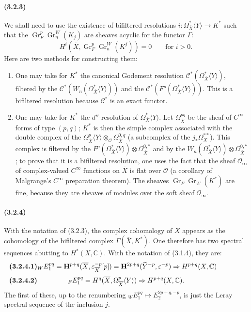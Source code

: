 \documentclass[10pt]{article}
\newcommand{\C}{\mathbb C}
\newcommand{\Gr}{\operatorname{Gr}}
\begin{document}
\paragraph{(3.2.3)} We shall need to use the existence of bifiltered resolutions $i:\Omega_{\overline X}^{*}\langle Y\rangle\longrightarrow K^*$ such that the $\Gr_F^p\Gr_n^W(K_j)$ are sheaves acyclic for the functor $\Gamma$:
\[
H^i(\overline X,\Gr_F^p\Gr_n^W(K^j))=0\qquad \text{for }i>0.
\]
Here are two methods for constructing them:
\begin{enumerate}[label=\textit{\alph*)}]
\item One may take for $K^*$ the canonical Godement resolution $\mathcal C^*(\Omega_{\overline X}^{*}\langle Y\rangle)$, filtered by the $\mathcal C^*(W_n(\Omega_{\overline X}^{*}\langle Y\rangle))$ and the $\mathcal C^*(F^p(\Omega_{\overline X}^{*}\langle Y\rangle))$. This is a bifiltered resolution because $\mathcal C^*$ is an exact functor.
\item One may take for $K^*$ the $d''$-resolution of $\Omega_{\overline X}^{*}\langle Y\rangle$. Let $\Omega_{\overline X}^{pq}$ be the sheaf of $C^\infty$ forms of type $(p,q)$; $K^*$ is then the simple complex associated with the double complex of the $\Omega_{\overline X}^{p}\langle Y\rangle\otimes_{\mathcal O}\Omega_{\overline X}^{0,q}$ (a subcomplex of the $j_*\Omega_X^{**}$). This complex is filtered by the $F^p(\Omega_{\overline X}^{*}\langle Y\rangle)\otimes\Omega_{\overline X}^{0,*}$ and by the $W_n(\Omega_{\overline X}^{*}\langle Y\rangle)\otimes\Omega_{\overline X}^{0,*}$; to prove that it is a bifiltered resolution, one uses the fact that the sheaf $\mathcal O_\infty$ of complex-valued $C^\infty$ functions on $\overline X$ is flat over $\mathcal O$ (a corollary of Malgrange's $C^\infty$ preparation theorem). The sheaves $\Gr_F\Gr_W(K^*)$ are fine, because they are sheaves of modules over the soft sheaf $\mathcal O_\infty$.
\end{enumerate}

\paragraph{(3.2.4)} With the notation of (3.2.3), the complex cohomology of $X$ appears as the cohomology of the bifiltered complex $\Gamma(\overline X,K^*)$. One therefore has two spectral sequences abutting to $H^*(X,\C)$. With the notation of (3.1.4), they are:
\[
\makebox[\textwidth][s]{\textbf{(3.2.4.1)}\hfill$\displaystyle {}_W E_1^{pq}=\mathbf H^{p+q}(\overline X,\varepsilon_{\overline X}^{-p}[p])=\mathbf H^{2p+q}(\widetilde Y^{-p},\varepsilon^{-p})\Rightarrow H^{p+q}(X,\C)$\hfill\phantom{\textbf{(3.2.4.1)}}}
\]
\[
\makebox[\textwidth][s]{\textbf{(3.2.4.2)}\hfill$\displaystyle {}_F E_1^{pq}=H^q(\overline X,\Omega_{\overline X}^p\langle Y\rangle)\Rightarrow H^{p+q}(X,\C).$\hfill\phantom{\textbf{(3.2.4.2)}}}
\]
The first of these, up to the renumbering ${}_W E_1^{pq}\mapsto E_2^{2p+q,-p}$, is just the Leray spectral sequence of the inclusion $j$.
\end{document}
